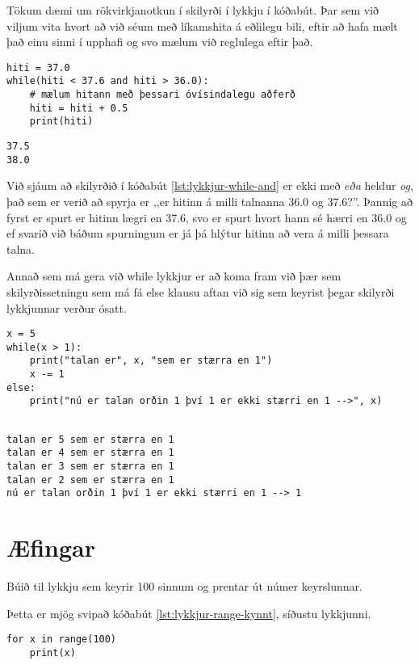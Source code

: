 Tökum dæmi um rökvirkjanotkun í skilyrði í lykkju í kóðabút.
Þar sem við viljum vita hvort að við séum með líkamshita á eðlilegu bili, eftir að hafa mælt það einu sinni í upphafi og svo mælum við reglulega eftir það.

\begin{lstlisting}[caption=while lykkja með og rökvirkjanum, label=lst:lykkjur-while-and]
hiti = 37.0
while(hiti < 37.6 and hiti > 36.0):
	# mælum hitann með þessari óvísindalegu aðferð
	hiti = hiti + 0.5
	print(hiti)
\end{lstlisting}
\lstset{style=uttak}
\begin{lstlisting}
37.5
38.0
\end{lstlisting}
\lstset{style=venjulegt}

Við sjáum að skilyrðið í kóðabút \ref{lst:lykkjur-while-and} er ekki með \emph{eða} heldur \emph{og}, það sem er verið að spyrja er ,,er hitinn á milli talnanna 36.0 og 37.6?''.
Þannig að fyrst er spurt er hitinn lægri en 37.6, svo er spurt hvort hann sé hærri en 36.0 og ef svarið við báðum spurningum er já þá hlýtur hitinn að vera á milli þessara talna. 

Annað sem má gera við while lykkjur er að koma fram við þær sem skilyrðissetningu sem má fá else klausu aftan við sig sem keyrist þegar skilyrði lykkjunnar verður ósatt.

\begin{lstlisting}[caption=Að nota else með while, label=lst:lykkjur-while-else]
x = 5
while(x > 1):
	print("talan er", x, "sem er stærra en 1")
	x -= 1 
else:
	print("nú er talan orðin 1 því 1 er ekki stærri en 1 -->", x)
	
\end{lstlisting}
\lstset{style=uttak}
\begin{lstlisting}
talan er 5 sem er stærra en 1
talan er 4 sem er stærra en 1
talan er 3 sem er stærra en 1
talan er 2 sem er stærra en 1
nú er talan orðin 1 því 1 er ekki stærri en 1 --> 1
\end{lstlisting}
\lstset{style=venjulegt}



\newpage
\section{Æfingar}
\begin{exercise}\label{lyk1}
	Búið til lykkju sem keyrir 100 sinnum og prentar út númer keyrslunnar.
\end{exercise}
\begin{Answer}[ref={lyk1}]
Þetta er mjög svipað kóðabút \ref{lst:lykkjur-range-kynnt}, síðustu lykkjunni.
\begin{lstlisting}
for x in range(100)
	print(x)\end{lstlisting}
\end{Answer}

